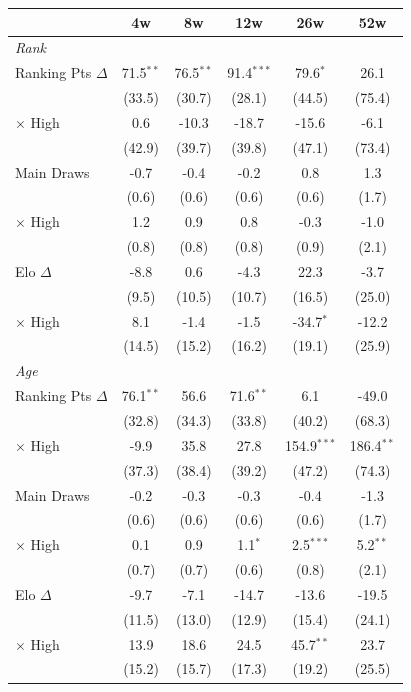 \begin{tabular}{l*{5}{c}}
\toprule
 & 4w & 8w & 12w & 26w & 52w \\
\midrule
\multicolumn{6}{l}{\textit{Rank}} \\
  Ranking Pts $\Delta$ & 71.5$^{**}$ & 76.5$^{**}$ & 91.4$^{***}$ & 79.6$^{*}$ & 26.1 \\
  & (33.5) & (30.7) & (28.1) & (44.5) & (75.4) \\
  $\times$ High & 0.6 & -10.3 & -18.7 & -15.6 & -6.1 \\
  & (42.9) & (39.7) & (39.8) & (47.1) & (73.4) \\[0.3em]
  Main Draws & -0.7 & -0.4 & -0.2 & 0.8 & 1.3 \\
  & (0.6) & (0.6) & (0.6) & (0.6) & (1.7) \\
  $\times$ High & 1.2 & 0.9 & 0.8 & -0.3 & -1.0 \\
  & (0.8) & (0.8) & (0.8) & (0.9) & (2.1) \\[0.3em]
  Elo $\Delta$ & -8.8 & 0.6 & -4.3 & 22.3 & -3.7 \\
  & (9.5) & (10.5) & (10.7) & (16.5) & (25.0) \\
  $\times$ High & 8.1 & -1.4 & -1.5 & -34.7$^{*}$ & -12.2 \\
  & (14.5) & (15.2) & (16.2) & (19.1) & (25.9) \\[0.3em]
\midrule
\multicolumn{6}{l}{\textit{Age}} \\
  Ranking Pts $\Delta$ & 76.1$^{**}$ & 56.6 & 71.6$^{**}$ & 6.1 & -49.0 \\
  & (32.8) & (34.3) & (33.8) & (40.2) & (68.3) \\
  $\times$ High & -9.9 & 35.8 & 27.8 & 154.9$^{***}$ & 186.4$^{**}$ \\
  & (37.3) & (38.4) & (39.2) & (47.2) & (74.3) \\[0.3em]
  Main Draws & -0.2 & -0.3 & -0.3 & -0.4 & -1.3 \\
  & (0.6) & (0.6) & (0.6) & (0.6) & (1.7) \\
  $\times$ High & 0.1 & 0.9 & 1.1$^{*}$ & 2.5$^{***}$ & 5.2$^{**}$ \\
  & (0.7) & (0.7) & (0.6) & (0.8) & (2.1) \\[0.3em]
  Elo $\Delta$ & -9.7 & -7.1 & -14.7 & -13.6 & -19.5 \\
  & (11.5) & (13.0) & (12.9) & (15.4) & (24.1) \\
  $\times$ High & 13.9 & 18.6 & 24.5 & 45.7$^{**}$ & 23.7 \\
  & (15.2) & (15.7) & (17.3) & (19.2) & (25.5) \\[0.3em]
\midrule
\bottomrule
\end{tabular}
